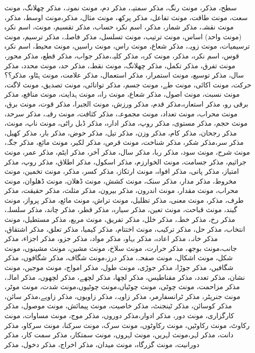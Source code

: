 سطح، مذکر، مونث
رنگ، مذکر
سمتیہ، مذکر
دم، مونث
نمونہ، مذکر
چھلانگ، مونث
سعت، مونث
طاقت، مونث
تفاعل، مذکر
پرکھ، مونث
مثال، مذکر،مونث
اوسط، مذکر، مونث
نقشہ، مذکر
شمار، مذکر، اسم نکرہ
حساب، مذکر
تقسیم، مونث، اسم نکرہ (مونث واحد)
اساس، مونث
ترتیب، مونث
تسلسل، مذکر
فاصلہ، مذکر
ترسیم، مونث
ترسیمیات، مونث
زویہ، مذکر
شعاع، مونث
راس، مونث
راسیں، مونث
محیط، اسم نکرہ
قوس، اسم نکرہ، مذکر، مونث
کرہ، مذکر
کلیہ،مذکر
جواب، مذکر
قطع، مذکر
محور، مونث
تفرق، مذکر
تکمل، مذکر
چھلانگ، مونث
نقطہ، مذکر
حد، مونث
محدد، مذکر
سال، مذکر
توسیع، مونث
استمرار، مذکر
استعمال، مذکر
علامت، مونث
ہٹاو، مذکر؟؟
حرکت، مونث
اکائی، مونث
طے، مونث
جسم، مذکر
توانائی، مونث
تصدیق، مونث
لاگت، مونث
نسبت، مونث
اصول، مذکر
شعاع، مونث
راہ، مونث
ہدایت، مونث
منافع، مذکر
برقی رو، مذکر
استعارہ،مذکر
قدم، مذکر
ورزش، مونث
الجبرا، مذکر
قوت، مونث
برق، مونث
محراب، مونث
تعداد، مونث
مجموعہ، مذکر
کثافت، مونث
رقبہ، مذکر
سرحد، مونث
حجم، مذکر
مستوی، مذکر
روپ، مذکر
ادارہ، مذکر
ڈبل راٹی، مونث
ناپ، مونث، مذکر
رجحان، مذکر
کام، مذکر
وزن، مذکر
تیل، مذکر
حوض، مذکر
بار، مذکر
کھیل، مذکر
سر،مذکر
شکر، مذکر
شناخت، مونث
 قرص، مذکر
لکیر، مونث
مائع، مذکر
جگہ، مونث
شرح، مونث
سود، مذکر
ربا، مذکر
سال، مذکر
آخر، مذکر
ایٹم، مذکر
عمر، مونث
جراثیم، مذکر
جسامت، مونث
الخوارزم، مذکر
اسکول، مذکر
اطلاق، مذکر
روپ، مذکر
امتیاز، مذکر
پانی، مذکر
افواہ، مونث
ارتکاز، مذکر
کسر، مذکر، مونث
تخمین، مونث
مخروط، مذکر
مدار، مذکر
سنک، مونث
کشش، مونث
ڈھلان، مونث
ڈھلوان، مونث
محراب، مونث
مقدار، مونث
اندرون، مذکر
بیرون، مذکر
مثلث، مذکر
حقیقت، مذکر
طرف، مذکر، مونث
معنی، مذکر
تظلیل، مونث
تراش، مونث
مائع، مذکر
پرواز، مونث
گیند، مونث
قباحت، مونث
تعین، مذکر
سیارہ، مذکر
قطر، مذکر
چاند، مذکر
سلسلہ، مذکر
رخ، مذکر
خطہ، مذکر
خلل، مذکر
تفریق، مونث
مربع، مذکر
مستطیل، مونث
انتخاب، مذکر
حل، مذکر
ترکیب، مونث
اختتام، مذکر
کیمیا، مذکر
تعلق، مذکر
اشتقاق، مذکر
خانہ، مذکر
اعادہ، مذکر
بہاو، مذکر
مواد، مذکر
جزو، مذکر
اجزاء، مذکر
جانب،مونث
بوجھ، مذکر
حرارت، مونث
سلاخ، مونث
مشین، مونث
مشینوں، مونث
شکل، مونث
اشکال، مونث
صفحہ، مذکر
درز،مونث
شگاف، مذکر
شگافوں، مذکر
شگافیں، مذکر
جوڑا، مذکر
جوڑی، مونث
طول، مذکر
امواج، مونث
موجیں، مونث
نشان، مذکر
تعدد، مذکر
مقناطیس، مذکر
لچھا، مذکر
لچھے، مذکر
لچھوں، مذکر
امالہ، مذکر
مزاحمت، مونث
چوٹی، مونث
چوٹیاں،مونث
چوٹیوں،مونث
شدت، مونث
موٹر، مونث
جنریٹر، مذکر
ٹرانسفارمر، مذکر
زاویہ، مذکر
زاویوں، مذکر
زاویے،مذکر
سائن، مذکر
کوسائن، مذکر
ٹینجنٹ، مذکر
خاصیت، مونث
پیمائش، مونث
موصول، مذکر
کارگزاری، مونث
دور، مذکر
ادوار،مذکر
دوروں، مذکر
موج، مونث
مساوات، مونث
رکاوٹ، مونث
رکاوٹیں، مونث
رکاوٹوں، مونث
سرک، مونث
سرکنا، مونث
سرکاو، مذکر
دانت، مذکر
لہر،مونث
لہریں، مونث
لہروں، مونث
سمتکار، مذکر
سمت کار، مذکر
دورانیت، مونث
گزرگاہ، مونث
میدان، مذکر
اخراج، مذکر
دخول، مذکر

